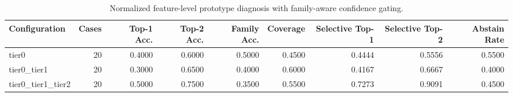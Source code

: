\begin{table}[t]
\centering
\caption{Normalized feature-level prototype diagnosis with family-aware confidence gating.}
\label{tab:dice_stressor_hierarchical_diagnosis}
\footnotesize
\begin{tabular}{lrrrrrrrr}
\toprule
Configuration & Cases & Top-1 Acc. & Top-2 Acc. & Family Acc. & Coverage & Selective Top-1 & Selective Top-2 & Abstain Rate \\
\midrule
tier0 & 20 & 0.4000 & 0.6000 & 0.5000 & 0.4500 & 0.4444 & 0.5556 & 0.5500 \\
tier0_tier1 & 20 & 0.3000 & 0.6500 & 0.4000 & 0.6000 & 0.4167 & 0.6667 & 0.4000 \\
tier0_tier1_tier2 & 20 & 0.5000 & 0.7500 & 0.3500 & 0.5500 & 0.7273 & 0.9091 & 0.4500 \\
\bottomrule
\end{tabular}

\end{table}
